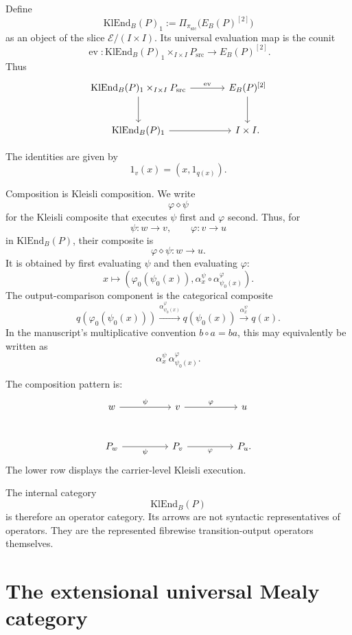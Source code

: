 Define
\[
        \mathrm{KlEnd}_B(P)_1
        :=
        \Pi_{\pi_{\mathrm{src}}}\bigl(E_B(P)^{[2]}\bigr)
\]
as an object of the slice \(\mathcal E/(I\times I)\).  Its universal evaluation map is the counit
\[
        \operatorname{ev}:
        \mathrm{KlEnd}_B(P)_1\times_{I\times I}P_{\mathrm{src}}
        \longrightarrow
        E_B(P)^{[2]}.
\]
Thus
\[
\begin{tikzcd}[column sep=large,row sep=large]
\mathrm{KlEnd}_B(P)_1\times_{I\times I}P_{\mathrm{src}}
\ar[r,"\operatorname{ev}"]
\ar[d]
&
E_B(P)^{[2]}
\ar[d]
\\
\mathrm{KlEnd}_B(P)_1
\ar[r]
&
I\times I .
\end{tikzcd}
\]

The identities are given by
\[
        1_v(x)=(x,1_{q(x)}).
\]

Composition is Kleisli composition.  We write
\[
        \varphi\diamond\psi
\]
for the Kleisli composite that executes \(\psi\) first and \(\varphi\) second.  Thus, for
\[
        \psi:w\longrightarrow v,
        \qquad
        \varphi:v\longrightarrow u
\]
in \(\mathrm{KlEnd}_B(P)\), their composite is
\[
        \varphi\diamond\psi:w\longrightarrow u.
\]
It is obtained by first evaluating \(\psi\) and then evaluating \(\varphi\):
\[
        x\longmapsto
        \left(
            \varphi_0(\psi_0(x)),
            \alpha_x^\psi\circ\alpha_{\psi_0(x)}^\varphi
        \right).
\]
The output-comparison component is the categorical composite
\[
        q(\varphi_0(\psi_0(x)))
        \xrightarrow{\alpha_{\psi_0(x)}^\varphi}
        q(\psi_0(x))
        \xrightarrow{\alpha_x^\psi}
        q(x).
\]
In the manuscript's multiplicative convention \(b\circ a=ba\), this may equivalently be written as
\[
        \alpha_x^\psi\,\alpha_{\psi_0(x)}^\varphi .
\]

The composition pattern is:
\[
\begin{tikzcd}[column sep=huge,row sep=large]
w \ar[r,"\psi"] & v \ar[r,"\varphi"] & u
\\
P_w \ar[r,swap,"\psi"] &
P_v \ar[r,swap,"\varphi"] &
P_u .
\end{tikzcd}
\]
The lower row displays the carrier-level Kleisli execution.

The internal category
\[
        \mathrm{KlEnd}_B(P)
\]
is therefore an operator category.  Its arrows are not syntactic representatives of operators.
They are the represented fibrewise transition-output operators themselves.

\section{The extensional universal Mealy category}
\label{sec:extensional-universal-mealy-category}

